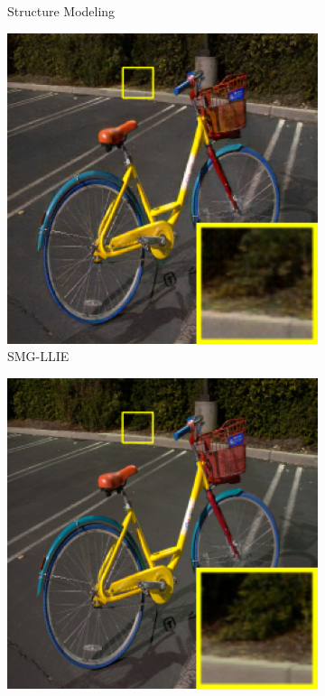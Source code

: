 \documentclass[a4paper, 10pt]{article}
\begin{document}
\begin{figure}[htb]
\begin{subfigure}{0.25\columnwidth}
			\captionsetup{font=scriptsize}
			\caption{Structure Modeling}
			\label{fig: Structure Modeling}
		\end{subfigure}
		\begin{subfigure}{0.25\columnwidth}
			\includegraphics[width=\linewidth]{picture/LLIE/Structure Modeling and Guidance/Ours}
			\captionsetup{font=scriptsize}
			\caption{SMG-LLIE}
			\label{fig: SMG-LLIE}
		\end{subfigure}
		\begin{subfigure}{0.25\columnwidth}
			\includegraphics[width=\linewidth]{picture/LLIE/Structure Modeling and Guidance/Ground Truth}

\end{subfigure}
\end{figure}
\end{document}
